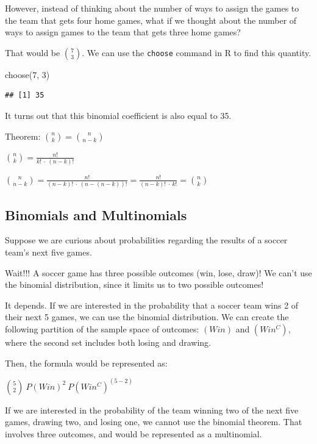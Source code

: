 \documentclass[
  11pt,
]{book}
\newenvironment{Shaded}{\begin{snugshade}}{\end{snugshade}}
\newcommand{\DecValTok}[1]{\textcolor[rgb]{0.00,0.00,0.81}{#1}}
\newcommand{\FunctionTok}[1]{\textcolor[rgb]{0.00,0.00,0.00}{#1}}
\newcommand{\NormalTok}[1]{#1}
\theoremstyle{definition}
\theoremstyle{definition}
\theoremstyle{definition}
\theoremstyle{definition}
\theoremstyle{remark}
\begin{document}
However, instead of thinking about the number of ways to assign the games to the team that gets four home games, what if we thought about the number of ways to assign games to the team that gets three home games?

That would be \(\binom{7}{3}\). We can use the \texttt{choose} command in R to find this quantity.

\begin{Shaded}
\begin{Highlighting}[]
\FunctionTok{choose}\NormalTok{(}\DecValTok{7}\NormalTok{, }\DecValTok{3}\NormalTok{)}
\end{Highlighting}
\end{Shaded}

\begin{verbatim}
## [1] 35
\end{verbatim}

It turns out that this binomial coefficient is also equal to 35.

Theorem: \(\binom{n}{k} = \binom{n}{n-k}\)

\(\binom{n}{k} = \frac{n!}{k!\ \cdot\ (n-k)!}\)

\(\binom{n}{n-k} = \frac{n!}{(n-k)!\ \cdot\ (n-(n-k))!} = \frac{n!}{(n-k)!\ \cdot\ k!} = \binom{n}{k}\)

\hypertarget{binomials-and-multinomials}{%
\subsection{Binomials and Multinomials}\label{binomials-and-multinomials}}

Suppose we are curious about probabilities regarding the results of a soccer team's next five games.

Wait!!! A soccer game has three possible outcomes (win, lose, draw)! We can't use the binomial distribution, since it limits us to two possible outcomes!

It depends. If we are interested in the probability that a soccer team wins 2 of their next 5 games, we can use the binomial distribution. We can create the following partition of the sample space of outcomes: \((Win)\) and \((Win^C)\), where the second set includes both losing and drawing.

Then, the formula would be represented as:

\(\binom{5}{2}\ P(Win)^2\  P(Win^C)^{(5-2)}\)

If we are interested in the probability of the team winning two of the next five games, drawing two, and losing one, we cannot use the binomial theorem. That involves three outcomes, and would be represented as a multinomial.
\end{document}
